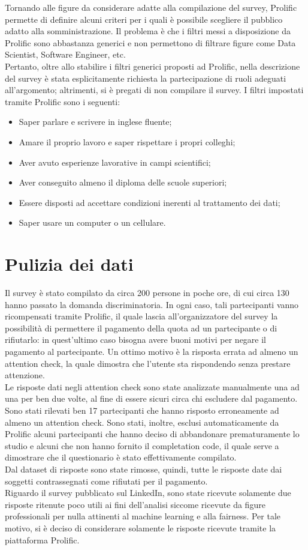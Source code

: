 Tornando alle figure da considerare adatte alla compilazione del survey, Prolific permette di definire alcuni criteri per i quali è possibile scegliere il pubblico adatto alla somministrazione. Il problema è che i filtri messi a disposizione da Prolific sono abbastanza generici e non permettono di filtrare figure come Data Scientist, Software Engineer, etc.\\
Pertanto, oltre allo stabilire i filtri generici proposti ad Prolific, nella descrizione del survey è stata esplicitamente richiesta la partecipazione di ruoli adeguati all'argomento; altrimenti, si è pregati di non compilare il survey. I filtri impostati tramite Prolific sono i seguenti:
\begin{itemize}
    \item Saper parlare e scrivere in inglese fluente;
    \item Amare il proprio lavoro e saper rispettare i propri colleghi;
    \item Aver avuto esperienze lavorative in campi scientifici;
    \item Aver conseguito almeno il diploma delle scuole superiori;
    \item Essere disposti ad accettare condizioni inerenti al trattamento dei dati;
    \item Saper usare un computer o un cellulare.
\end{itemize}

\section{Pulizia dei dati}
Il survey è stato compilato da circa 200 persone in poche ore, di cui circa 130 hanno passato la domanda discriminatoria. In ogni caso, tali partecipanti vanno ricompensati tramite Prolific, il quale lascia all'organizzatore del survey la possibilità di permettere il pagamento della quota ad un partecipante o di rifiutarlo: in quest'ultimo caso bisogna avere buoni motivi per negare il pagamento al partecipante. Un ottimo motivo è la risposta errata ad almeno un attention check, la quale dimostra che l'utente sta rispondendo senza prestare attenzione.\\
Le risposte dati negli attention check sono state analizzate manualmente una ad una per ben due volte, al fine di essere sicuri circa chi escludere dal pagamento. Sono stati rilevati ben 17 partecipanti che hanno risposto erroneamente ad almeno un attention check. Sono stati, inoltre, esclusi automaticamente da Prolific alcuni partecipanti che hanno deciso di abbandonare prematuramente lo studio e alcuni che non hanno fornito il completation code, il quale serve a dimostrare che il questionario è stato effettivamente compilato.\\
Dal dataset di risposte sono state rimosse, quindi, tutte le risposte date dai soggetti contrassegnati come rifiutati per il pagamento.\\
Riguardo il survey pubblicato sul LinkedIn, sono state ricevute solamente due risposte ritenute poco utili ai fini dell'analisi siccome ricevute da figure professionali per nulla attinenti al machine learning e alla fairness. Per tale motivo, si è deciso di considerare solamente le risposte ricevute tramite la piattaforma Prolific.


